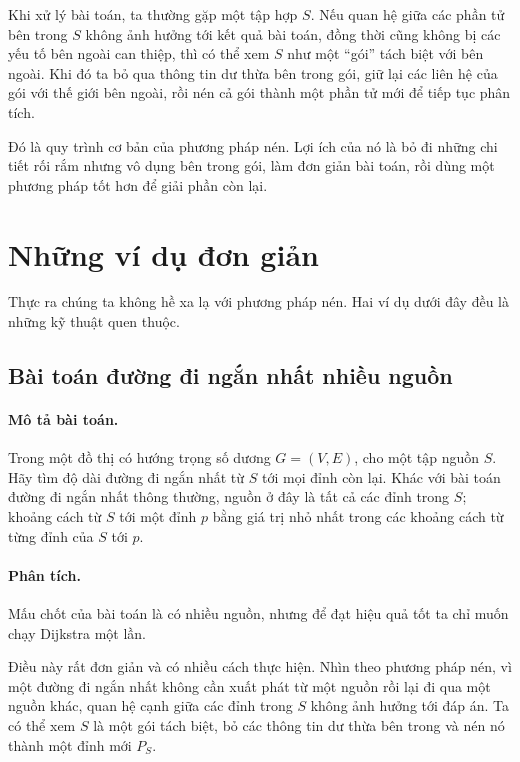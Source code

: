 \documentclass[11pt]{article}
\begin{document}
Khi xử lý bài toán, ta thường gặp một tập hợp $S$. Nếu quan hệ giữa các phần
tử bên trong $S$ không ảnh hưởng tới kết quả bài toán, đồng thời cũng không bị
các yếu tố bên ngoài can thiệp, thì có thể xem $S$ như một ``gói'' tách biệt
với bên ngoài. Khi đó ta bỏ qua thông tin dư thừa bên trong gói, giữ lại các
liên hệ của gói với thế giới bên ngoài, rồi nén cả gói thành một phần tử mới
để tiếp tục phân tích.

Đó là quy trình cơ bản của phương pháp nén. Lợi ích của nó là bỏ đi những chi
tiết rối rắm nhưng vô dụng bên trong gói, làm đơn giản bài toán, rồi dùng một
phương pháp tốt hơn để giải phần còn lại.

\section{Những ví dụ đơn giản}

Thực ra chúng ta không hề xa lạ với phương pháp nén. Hai ví dụ dưới đây đều
là những kỹ thuật quen thuộc.

\subsection{Bài toán đường đi ngắn nhất nhiều nguồn}

\paragraph{Mô tả bài toán.}
Trong một đồ thị có hướng trọng số dương $G=(V,E)$, cho một tập nguồn $S$.
Hãy tìm độ dài đường đi ngắn nhất từ $S$ tới mọi đỉnh còn lại. Khác với bài
toán đường đi ngắn nhất thông thường, nguồn ở đây là tất cả các đỉnh trong
$S$; khoảng cách từ $S$ tới một đỉnh $p$ bằng giá trị nhỏ nhất trong các khoảng
cách từ từng đỉnh của $S$ tới $p$.

\paragraph{Phân tích.}
Mấu chốt của bài toán là có nhiều nguồn, nhưng để đạt hiệu quả tốt ta chỉ muốn
chạy Dijkstra một lần.

Điều này rất đơn giản và có nhiều cách thực hiện. Nhìn theo phương pháp nén,
vì một đường đi ngắn nhất không cần xuất phát từ một nguồn rồi lại đi qua một
nguồn khác, quan hệ cạnh giữa các đỉnh trong $S$ không ảnh hưởng tới đáp án.
Ta có thể xem $S$ là một gói tách biệt, bỏ các thông tin dư thừa bên trong và
nén nó thành một đỉnh mới $P_S$.
\end{document}
